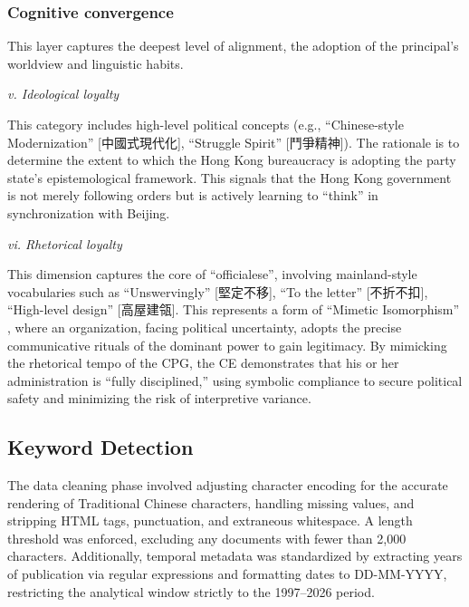 \documentclass[9pt,a4paper,twocolumn,twoside]{rho-class/rho}
\begin{document}
        \subsubsection{Cognitive convergence}

            This layer captures the deepest level of alignment, the adoption of the principal's worldview and linguistic habits.

            \textit{v. Ideological loyalty}

            This category includes high-level political concepts (e.g., ``Chinese-style Modernization'' [中國式現代化], ``Struggle Spirit'' [鬥爭精神]). The rationale is to determine the 
            extent to which the Hong Kong bureaucracy is adopting the party state's epistemological framework. This signals that the Hong Kong government is not merely following orders but is 
            actively learning to ``think'' in synchronization with Beijing.


            \textit{vi. Rhetorical loyalty}

            This dimension captures the core of ``officialese'', involving mainland-style vocabularies such as ``Unswervingly'' [堅定不移], ``To the letter'' [不折不扣], ``High-level design'' 
            [高屋建瓴]. This represents a form of ``Mimetic Isomorphism'' \parencite{dimaggio1983iron}, where an organization, facing political uncertainty, adopts the precise communicative 
            rituals of the dominant power to gain legitimacy. By mimicking the rhetorical tempo of the CPG, the CE demonstrates that his or her administration is ``fully disciplined,'' 
            using symbolic compliance to secure political safety and minimizing the risk of interpretive variance.

    \subsection{Keyword Detection}

		The data cleaning phase involved adjusting character encoding for the accurate rendering of Traditional Chinese characters, handling missing values, and stripping HTML tags, punctuation, and extraneous whitespace. A length threshold was enforced, excluding any documents with fewer than 2,000 characters. Additionally, temporal metadata was standardized by extracting years of publication via regular expressions and formatting dates to DD-MM-YYYY, restricting the analytical window strictly to the 1997–2026 period.
        
\end{document}

